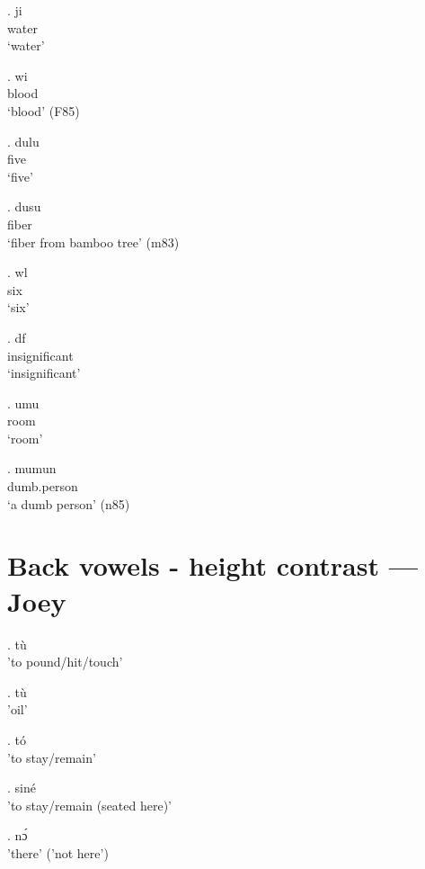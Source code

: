 \documentclass{assets/fieldnotes}
\begin{document}
\exg. ji \\
water \\
`water'

\exg. wi \\
blood \\
`blood' (F85)




\exg. dulu \\
five \\
`five'

\exg. dusu \\
fiber \\
`fiber from bamboo tree' (m83)

\exg. wl \\
six \\
`six'

\exg. df \\
insignificant \\
`insignificant'

\exg. umu \\
room \\
`room'

\exg. mumun \\
dumb.person \\
`a dumb person' (n85)

\section{Back vowels - height contrast --- Joey}


\ex. tù \\
'to pound/hit/touch'

\ex. tù \\
'oil'

\ex. tó \\
'to stay/remain' \\

\ex. siné \\
'to stay/remain (seated here)'

\ex. nɔ́ \\
'there' ('not here') \\
\end{document}
